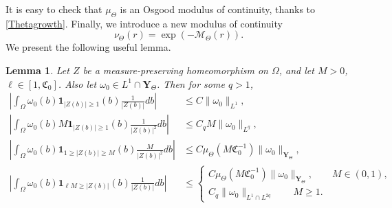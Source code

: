 \documentclass[12pt]{article}
\newtheorem{lemma}{Lemma}
\begin{document}
It is easy to check that $\mu_{\Theta}$ is an Osgood modulus of continuity, thanks to \eqref{Thetagrowth}. Finally, we introduce a new modulus of continuity
\begin{equation}\label{numod}
\nu_{\Theta} (r) = \exp ( - \mathcal{M}_{\Theta} (r) ).
\end{equation} 
We present the following useful lemma.
\begin{lemma} \label{pointwise}
Let $Z$ be a measure-preserving homeomorphism on $\Omega$, and let $M >0$, $\ell  \in [1, \mathfrak{C}_0 ]$. Also let $\omega_0 \in L^1 \cap \mathbf{Y}_{\Theta}$. Then for some $q>1$,
\begin{equation} \label{pointwiseestimate}
\begin{split}
\left | \int_{\Omega } \omega_0 (b)  \mathbf{1}_{|Z(b) | \ge 1} (b) \frac{1}{|Z(b) | }  db \right | &\le C \| \omega_0 \|_{L^1}, \\
 \left | \int_{\Omega } \omega_0 (b) M \mathbf{1}_{|Z(b) | \ge 1} (b) \frac{1}{|Z(b) |^2 }  db \right |  &\le  C_q M \| \omega_0 \|_{L^q}, \\
\left | \int_{\Omega } \omega_0 (b) \mathbf{1}_{1 \ge |Z(b) | \ge M } (b) \frac{M}{|Z(b)|^2}   db \right | &\le C \mu_{\Theta} (M\mathfrak{C}_0^{-1} ) \| \omega_0 \|_{\mathbf{Y}_\Theta}, \\
\left | \int_{\Omega} \omega_0 (b) \mathbf{1}_{\ell M \ge |Z(b) | } (b) \frac{1}{|Z(b) | }   db \right | &\le \begin{cases} C  \mu_{\Theta} (M\mathfrak{C}_0^{-1} ) \| \omega_0 \|_{\mathbf{Y}_{\Theta} }, \qquad M \in (0, 1), \\ C_q  \|\omega_0\|_{L^{1} \cap L^{2q}}  \qquad M \ge 1.
\end{cases}
\end{split}
\end{equation}
\end{lemma}
\end{document}

